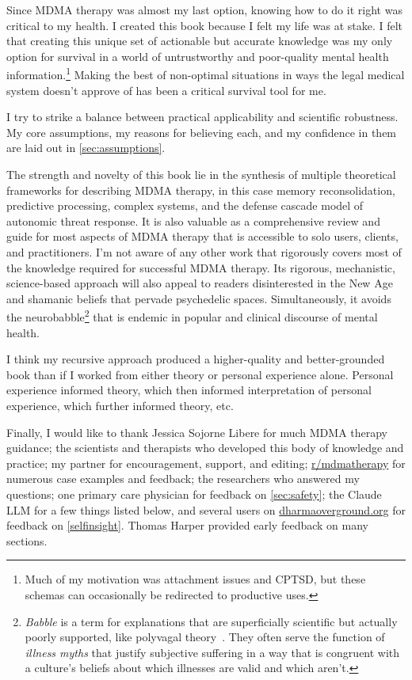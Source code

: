 \documentclass[11pt,oneside]{book}
\let\cite\parencite
\begin{document}
Since MDMA therapy was almost my last option, knowing how to do it right was critical to my health. I created this book because I felt my life was at stake. I felt that creating this unique set of actionable but accurate knowledge was my only option for survival in a world of untrustworthy and poor-quality mental health information.\footnote{Much of my motivation was attachment issues and CPTSD, but these schemas can occasionally be redirected to productive uses.} Making the best of non-optimal situations in ways the legal medical system doesn't approve of has been a critical survival tool for me.

I try to strike a balance between practical applicability and scientific robustness. My core assumptions, my reasons for believing each, and my confidence in them are laid out in \cref{sec:assumptions}.

The strength and novelty of this book lie in the synthesis of multiple theoretical frameworks for describing MDMA therapy, in this case memory reconsolidation, predictive processing, complex systems, and the defense cascade model of autonomic threat response. It is also valuable as a comprehensive review and guide for most aspects of MDMA therapy that is accessible to solo users, clients, and practitioners. I'm not aware of any other work that rigorously covers most of the knowledge required for successful MDMA therapy. Its rigorous, mechanistic, science-based approach will also appeal to readers disinterested in the New Age and shamanic beliefs that pervade psychedelic spaces. Simultaneously, it avoids the neurobabble\footnote{\textit{Babble} is a term for explanations that are superficially scientific but actually poorly supported, like polyvagal theory~\cite{luckPolyvagal}. They often serve the function of \textit{illness myths} that justify subjective suffering in a way that is congruent with a culture's beliefs about which illnesses are valid and which aren't.} that is endemic in popular and clinical discourse of mental health.

I think my recursive approach produced a higher-quality and better-grounded book than if I worked from either theory or personal experience alone. Personal experience informed theory, which then informed interpretation of personal experience, which further informed theory, etc.

Finally, I would like to thank Jessica Sojorne Libere for much MDMA therapy guidance; the scientists and therapists who developed this body of knowledge and practice; my partner for encouragement, support, and editing; \href{https://www.reddit.com/r/mdmatherapy}{r/mdmatherapy} for numerous case examples and feedback; the researchers who answered my questions; one primary care physician for feedback on \cref{sec:safety}; the Claude LLM for a few things listed below, and several users on \href{www.dharmaoverground.org}{dharmaoverground.org} for feedback on \cref{selfinsight}. Thomas Harper provided early feedback on many sections.
\end{document}
